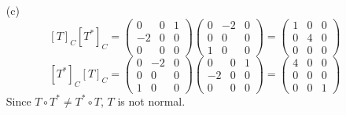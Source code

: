 \documentclass{article}
\begin{document}
\begin{itemize}
\begin{itemize}
		      \item [(c)] \[[T]_C[T^*]_C=\begin{pmatrix}0&0&1\\-2&0&0\\0&0&0\end{pmatrix}\begin{pmatrix}0&-2&0\\0&0&0\\1&0&0\end{pmatrix}=\begin{pmatrix}1&0&0\\0&4&0\\0&0&0\end{pmatrix}\]\[[T^*]_C[T]_C=\begin{pmatrix}0&-2&0\\0&0&0\\1&0&0\end{pmatrix}\begin{pmatrix}0&0&1\\-2&0&0\\0&0&0\end{pmatrix}=\begin{pmatrix}4&0&0\\0&0&0\\0&0&1\end{pmatrix}\]Since $T\circ T^*\neq T^*\circ T$, $T$ is not normal.
	      \end{itemize}
\end{itemize}

\newpage
\end{document}
